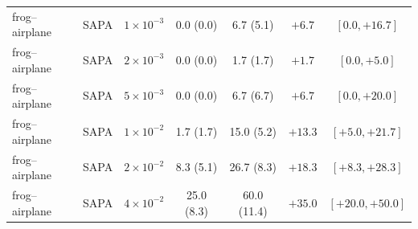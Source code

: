 \begin{table}[p]
\begin{tabular}{llccccc}
frog--airplane & SAPA & $1{\times}10^{-3}$ & 0.0 (0.0) & 6.7 (5.1) & $+6.7$ & $[0.0, +16.7]$ \\
frog--airplane & SAPA & $2{\times}10^{-3}$ & 0.0 (0.0) & 1.7 (1.7) & $+1.7$ & $[0.0, +5.0]$ \\
frog--airplane & SAPA & $5{\times}10^{-3}$ & 0.0 (0.0) & 6.7 (6.7) & $+6.7$ & $[0.0, +20.0]$ \\
frog--airplane & SAPA & $1{\times}10^{-2}$ & 1.7 (1.7) & 15.0 (5.2) & $+13.3$ & $[+5.0, +21.7]$ \\
frog--airplane & SAPA & $2{\times}10^{-2}$ & 8.3 (5.1) & 26.7 (8.3) & $+18.3$ & $[+8.3, +28.3]$ \\
frog--airplane & SAPA & $4{\times}10^{-2}$ & 25.0 (8.3) & 60.0 (11.4) & $+35.0$ & $[+20.0, +50.0]$ \\

\bottomrule
\end{tabular}
\end{table}



